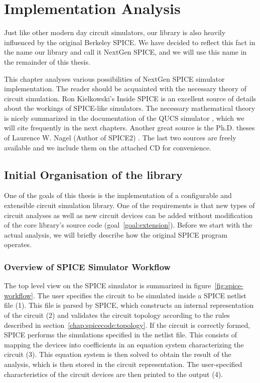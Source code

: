 \chapter{Implementation Analysis}
\label{chap:analysis}

Just like other modern day circuit simulators, our library is also heavily influenced by the original Berkeley SPICE. We have decided to reflect this fact in the name our library and call it NextGen SPICE, and we will use this name in the remainder of this thesis.

This chapter analyses various possibilities of NextGen SPICE simulator implementation. The reader should be acquainted with the necessary theory of circuit simulation. Ron Kielkowski's Inside SPICE \cite{inside_spice} is an excellent source of details about the workings of SPICE-like simulators. The necessary mathematical theory is nicely summarized in the documentation of the QUCS simulator \cite{qucs}, which we will cite frequently in the next chapters. Another great source is the Ph.D. theses of Laurence W. Nagel (Author of SPICE2) \cite{Nagel:M520}. The last two sources are freely available and we include them on the attached CD for convenience.

\section{Initial Organisation of the library}

One of the goals of this thesis is the implementation of a configurable and extensible circuit simulation library. One of the requirements is that new types of circuit analyses as well as new circuit devices can be added without modification of the core library's source code (goal~\ref{goal:extension}). Before we start with the actual analysis, we will briefly describe how the original SPICE program operates. 

\subsection{Overview of SPICE Simulator Workflow}
\label{chap:analysis:spice-review}
The top level view on the SPICE simulator is summarized in figure~\ref{fig:spice-workflow}. The user specifies the circuit to be simulated inside a SPICE netlist file (1). This file is parsed by SPICE, which constructs an internal representation of the circuit (2) and validates the circuit topology according to the rules described in section~\ref{chap:spicecode:topology}. If the circuit is correctly formed, SPICE performs the simulations specified in the netlist file. This consists of mapping the devices into coefficients in an equation system characterizing the circuit (3). This equation system is then solved to obtain the result of the analysis, which is then stored in the circuit representation. The user-specified characteristics of the circuit devices are then printed to the output (4). 

